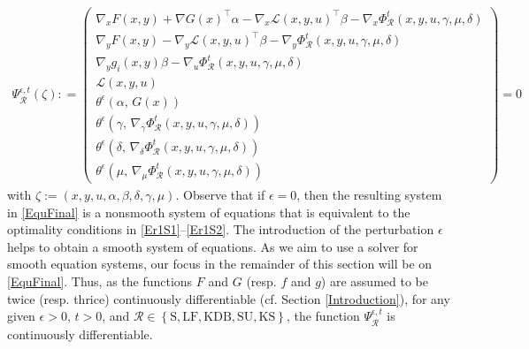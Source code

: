 \begin{align}\label{EquFinal}
    \Psi^{\epsilon,t}_{\mathcal{R}}(\zeta) : = \left( \begin{array}{c}
      \nabla_{x}F(x,y)+\nabla G(x)^{\top}\alpha-\nabla
_{x}\mathcal{L}(x,y,u)^{\top}\beta  -  \nabla_{x}
\Phi^{t}_{\mathcal{R}}(x,y,u,\gamma, \mu, \delta)\\   
       \nabla_{y}F(x,y)-\nabla_{y}\mathcal{L}(x,y,u)^{\top}
\beta -     \nabla_{y}
\Phi^{t}_{\mathcal{R}}(x,y,u,\gamma, \mu, \delta) \\
 \nabla_{y}g_{i}(x,y)\beta -\nabla_{u}
\Phi^{t}_{\mathcal{R}}(x,y,u,\gamma, \mu, \delta) \\
\mathcal{L}(x,y,u) \\
\theta^{\epsilon}(\alpha,\,G(x)) \\
\theta^{\epsilon}(\gamma,\,\nabla_{\gamma}\Phi_{\mathcal{R}}^{t}(x,y,u,\gamma,\mu,\delta))\\
\theta^{\epsilon}(\delta, \,\nabla_{\delta}\Phi_{\mathcal{R}}^{t}(x,y,u,\gamma,\mu,\delta)) \\
\theta^{\epsilon}(\mu,\,\nabla_{\mu}\Phi_{\mathcal{R}}^{t}(x,y,u,\gamma,\mu,\delta))
    \end{array}
    \right)=0
\end{align}
with $\zeta:=(x, y,u, \alpha, \beta, \delta, \gamma, \mu)$.  Observe that if $\epsilon =0$, then the resulting system in \eqref{EquFinal} is a nonsmooth system of equations that is equivalent to the optimality conditions in \eqref{Er1S1}--\eqref{Er1S2}. The introduction of the perturbation $\epsilon$ helps to obtain a smooth system of equations. As we aim to use a solver for smooth equation systems, our focus in the remainder of this section will be on \eqref{EquFinal}. 
Thus, as the functions $F$ and $G$ (resp. $f$ and $g$) are assumed to be twice (resp. thrice) continuously differentiable (cf. Section \ref{Introduction}), for any given $\epsilon >0$, $t>0$, and $\mathcal{R}\in \left\{\mbox{S}, \mbox{LF}, \mbox{KDB}, \mbox{SU}, \mbox{KS}\right\}$, the function $\Psi^{\epsilon,t}_{\mathcal{R}}$ is continuously differentiable. 
